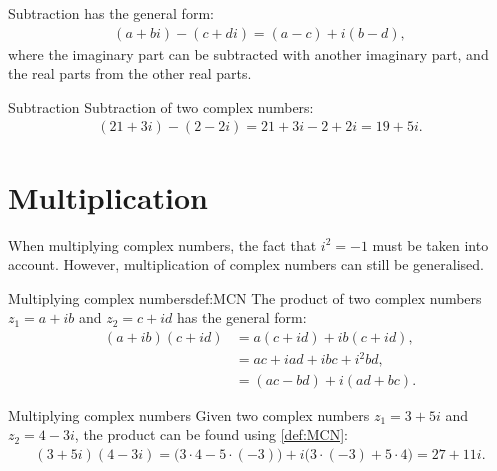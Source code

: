 \noindent 
Subtraction has the general form:
\begin{align*}
(a + bi) - (c + di) = (a - c) + i(b - d),
\end{align*}
where the imaginary part can be subtracted with another imaginary part, and the real parts from the other real parts.

\begin{example}{Subtraction}{}
Subtraction of two complex numbers:
\begin{align*}
(21 + 3i) - (2 - 2i) = 21 + 3i - 2 + 2i = 19 + 5i.
\end{align*}
\end{example}

\section{Multiplication}
When multiplying complex numbers, the fact that $i^2 =-1$ must be taken into account. However, multiplication of complex numbers can still be generalised. 
\begin{definition}{Multiplying complex numbers}{def:MCN}
The product of two complex numbers $z_1=a+ib$ and $z_2=c+id$ has the general form:
\begin{align*}
(a+ib)(c+id)&=a(c+id)+ib(c+id),
\\
&=ac+iad+ibc+i^2bd,
\\
&=(ac-bd)+i(ad+bc).
\end{align*}
\end{definition}
\begin{example}{Multiplying complex numbers}{}
Given two complex numbers $z_1=3+5i$ and $z_2=4-3i$, the product can be found using \cref{def:MCN}:
\begin{align*}
(3+5i)(4-3i) = \big(3\cdot4-5\cdot(-3)\big)+i\big(3\cdot(-3)+5\cdot4\big)=27+11i.
\end{align*}
\end{example}


